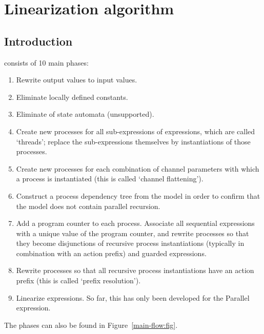 \chapter{Linearization algorithm}

\section*{Introduction}

\lpeq{} consists of 10 main phases:
\begin{enumerate}[1.]
\item Rewrite output values to input values.
\item Eliminate locally defined constants.
\item Eliminate of state automata (unsupported).
\item Create new processes for all sub-expressions of \pedi{} expressions, which are called `threads'; replace the sub-expressions themselves by instantiations of those processes.
\item Create new processes for each combination of channel parameters with which a process is instantiated (this is called `channel flattening').
\item Construct a process dependency tree from the model in order to confirm that the model does not contain parallel recursion.
\item Add a program counter to each process.
Associate all sequential expressions with a unique value of the program counter, and rewrite processes so that they become disjunctions of recursive process instantiations (typically in combination with an action prefix) and guarded \pedi{} expressions.
\item Rewrite processes so that all recursive process instantiations have an action prefix (this is called `prefix resolution').
\item Linearize \pedi{} expressions.
So far, this has only been developed for the Parallel expression.
\end{enumerate}

The phases can also be found in Figure~\ref{main-flow:fig}.

